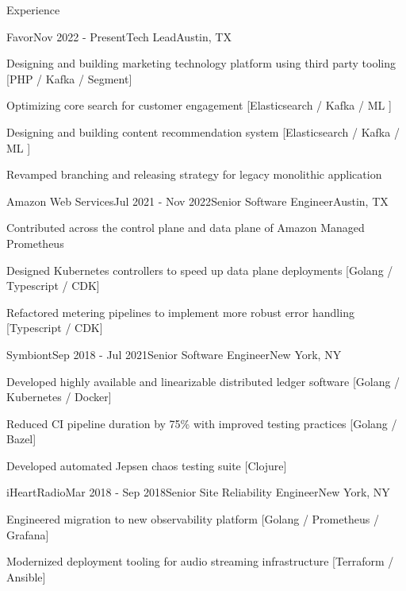 \documentclass{resume} %
\begin{document}
\begin{rSection}{Experience}

\begin{rSubsection}{Favor}{Nov 2022 - Present}{Tech Lead}{Austin, TX}
\item Designing and building marketing technology platform using third party tooling {\footnotesize [PHP / Kafka / Segment]}
\item Optimizing core search for customer engagement {\footnotesize [Elasticsearch / Kafka / ML ]}
\item Designing and building content recommendation system {\footnotesize [Elasticsearch / Kafka / ML ]}
\item Revamped branching and releasing strategy for legacy monolithic application

\end{rSubsection}

\begin{rSubsection}{Amazon Web Services}{Jul 2021 - Nov 2022}{Senior Software Engineer}{Austin, TX}
\item Contributed across the control plane and data plane of Amazon Managed Prometheus
\item Designed Kubernetes controllers to speed up data plane deployments {\footnotesize [Golang / Typescript / CDK]}
\item Refactored metering pipelines to implement more robust error handling {\footnotesize [Typescript / CDK]}

\end{rSubsection}

\begin{rSubsection}{Symbiont}{Sep 2018 - Jul 2021}{Senior Software Engineer}{New York, NY}
\item Developed highly available and linearizable distributed ledger software {\footnotesize [Golang / Kubernetes / Docker]}
\item Reduced CI pipeline duration by 75\% with improved testing practices {\footnotesize [Golang / Bazel]}
\item Developed automated Jepsen chaos testing suite {\footnotesize [Clojure]}

\end{rSubsection}


\begin{rSubsection}{iHeartRadio}{Mar 2018 - Sep 2018}{Senior Site Reliability Engineer}{New York, NY}
\item Engineered migration to new observability platform {\footnotesize [Golang / Prometheus / Grafana]}
\item Modernized deployment tooling for audio streaming infrastructure {\footnotesize [Terraform / Ansible]}


\end{rSubsection}
\end{rSection}
\end{document}
